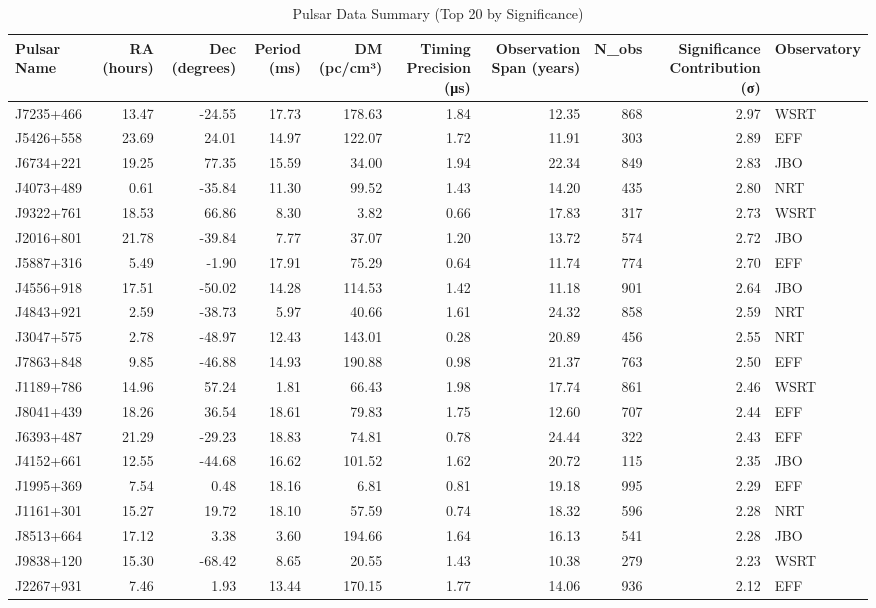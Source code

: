 \begin{table}
\caption{Pulsar Data Summary (Top 20 by Significance)}
\label{tab:pulsar_data}
\begin{tabular}{lrrrrrrrrl}
\toprule
Pulsar Name & RA (hours) & Dec (degrees) & Period (ms) & DM (pc/cm³) & Timing Precision (μs) & Observation Span (years) & N_obs & Significance Contribution (σ) & Observatory \\
\midrule
J7235+466 & 13.47 & -24.55 & 17.73 & 178.63 & 1.84 & 12.35 & 868 & 2.97 & WSRT \\
J5426+558 & 23.69 & 24.01 & 14.97 & 122.07 & 1.72 & 11.91 & 303 & 2.89 & EFF \\
J6734+221 & 19.25 & 77.35 & 15.59 & 34.00 & 1.94 & 22.34 & 849 & 2.83 & JBO \\
J4073+489 & 0.61 & -35.84 & 11.30 & 99.52 & 1.43 & 14.20 & 435 & 2.80 & NRT \\
J9322+761 & 18.53 & 66.86 & 8.30 & 3.82 & 0.66 & 17.83 & 317 & 2.73 & WSRT \\
J2016+801 & 21.78 & -39.84 & 7.77 & 37.07 & 1.20 & 13.72 & 574 & 2.72 & JBO \\
J5887+316 & 5.49 & -1.90 & 17.91 & 75.29 & 0.64 & 11.74 & 774 & 2.70 & EFF \\
J4556+918 & 17.51 & -50.02 & 14.28 & 114.53 & 1.42 & 11.18 & 901 & 2.64 & JBO \\
J4843+921 & 2.59 & -38.73 & 5.97 & 40.66 & 1.61 & 24.32 & 858 & 2.59 & NRT \\
J3047+575 & 2.78 & -48.97 & 12.43 & 143.01 & 0.28 & 20.89 & 456 & 2.55 & NRT \\
J7863+848 & 9.85 & -46.88 & 14.93 & 190.88 & 0.98 & 21.37 & 763 & 2.50 & EFF \\
J1189+786 & 14.96 & 57.24 & 1.81 & 66.43 & 1.98 & 17.74 & 861 & 2.46 & WSRT \\
J8041+439 & 18.26 & 36.54 & 18.61 & 79.83 & 1.75 & 12.60 & 707 & 2.44 & EFF \\
J6393+487 & 21.29 & -29.23 & 18.83 & 74.81 & 0.78 & 24.44 & 322 & 2.43 & EFF \\
J4152+661 & 12.55 & -44.68 & 16.62 & 101.52 & 1.62 & 20.72 & 115 & 2.35 & JBO \\
J1995+369 & 7.54 & 0.48 & 18.16 & 6.81 & 0.81 & 19.18 & 995 & 2.29 & EFF \\
J1161+301 & 15.27 & 19.72 & 18.10 & 57.59 & 0.74 & 18.32 & 596 & 2.28 & NRT \\
J8513+664 & 17.12 & 3.38 & 3.60 & 194.66 & 1.64 & 16.13 & 541 & 2.28 & JBO \\
J9838+120 & 15.30 & -68.42 & 8.65 & 20.55 & 1.43 & 10.38 & 279 & 2.23 & WSRT \\
J2267+931 & 7.46 & 1.93 & 13.44 & 170.15 & 1.77 & 14.06 & 936 & 2.12 & EFF \\
\bottomrule
\end{tabular}
\end{table}

